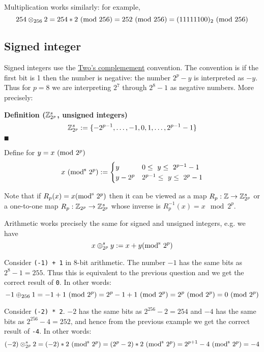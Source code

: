 \begin{example}  Multiplication works similarly: for example,
\[
254 \ensuremath{\otimes}_{256} 2 = 254 * 2 \ ({\rm mod}\ 256) = 252 \ ({\rm mod}\ 256) = (11111100)_2 \ ({\rm mod}\ 256)
\]
\end{example}

\subsection{Signed integer}
Signed integers use the \href{https://epubs.siam.org/doi/abs/10.1137/1.9780898718072.ch3}{Two's complemement} convention. The convention is if the first bit is 1 then the number is negative: the number $2^p - y$ is interpreted as $-y$. Thus for $p = 8$ we are interpreting $2^7$ through $2^8-1$ as negative numbers. More precisely:

\textbf{Definition (${\mathbb Z}_{2^p}^s$, unsigned integers)}
\[
{\mathbb Z}_{2^p}^s := \{-2^{p-1} ,\ldots, -1 ,0,1, \ldots, 2^{p-1}-1 \}
\]
\ensuremath{\QED}

\begin{definition} Define for $y = x\ ({\rm mod}\ 2^p)$
\[
x\ ({\rm mod}^{\rm s}\ 2^p) := \begin{cases} y & 0 \ensuremath{\leq} y \ensuremath{\leq} 2^{p-1}-1 \\
                             y - 2^p & 2^{p-1} \ensuremath{\leq} y \ensuremath{\leq} 2^p - 1
                             \end{cases}
\]
\end{definition}

Note that if $R_p(x) = x ({\rm mod}^{\rm s}\ 2^p)$ then it can be viewed as a map $R_p : {\mathbb Z} \rightarrow {\mathbb Z}_{2^p}^s$ or a one-to-one map $R_p : {\mathbb Z}_{2^p} \rightarrow {\mathbb Z}_{2^p}^s$ whose inverse is $R_p^{-1}(x) = x \mod 2^p$. 

Arithmetic works precisely the same for signed and unsigned integers, e.g. we have
\[
x \ensuremath{\oplus}_{2^p}^s y := x + y ({\rm mod}^{\rm s}\ 2^p)
\]
\begin{example} Consider \texttt{(-1) + 1} in 8-bit arithmetic. The number $-1$ has the same bits as $2^8 - 1 = 255$. Thus this is equivalent to the previous question and we get the correct result of \texttt{0}. In other words:
\[
-1 \ensuremath{\oplus}_{256} 1 = -1 + 1 \ ({\rm mod}\ 2^p) = 2^p-1  + 1 \ ({\rm mod}\ 2^p) = 2^p \ ({\rm mod}\ 2^p) = 0 \ ({\rm mod}\ 2^p)
\]
\end{example}

\begin{example} Consider \texttt{(-2) * 2}. $-2$ has the same bits as $2^{256} - 2 = 254$ and $-4$ has the same bits as $2^{256}-4 = 252$, and hence from the previous example we get the correct result of \texttt{-4}. In other words:
\[
(-2) \ensuremath{\otimes}_{2^p}^s 2 = (-2) * 2 \ ({\rm mod}^{\rm s}\ 2^p) = (2^p-2) * 2 \ ({\rm mod}^{\rm s}\ 2^p) = 2^{p+1}-4 \ ({\rm mod}^{\rm s}\ 2^p) = -4
\]
\end{example}



